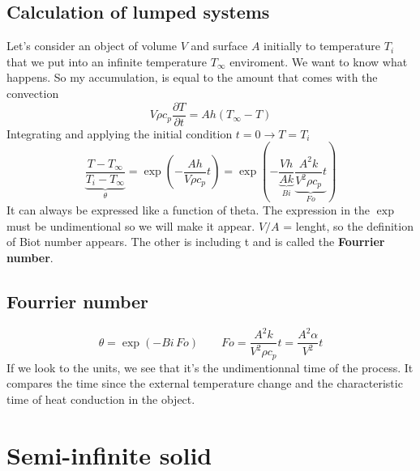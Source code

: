 	\subsection{Calculation of lumped systems}
		Let's consider an object of volume $V$ and surface $A$ initially to temperature $T_i$ that we put into an infinite temperature $T_\infty$ enviroment. We want to know what happens. So my accumulation, is equal to the amount that comes with the convection
		\begin{equation}
			V\rho c_p \frac{\partial T}{\partial t} = A h(T_\infty - T)
		\end{equation}
		Integrating and applying the initial condition $t = 0 \rightarrow T = T_i$
		\begin{equation}
			\underbrace{\frac{T-T_\infty}{T_i - T_\infty}}_{\theta} =
			 \exp \left( - \frac{Ah}{V\rho c_p}t \right) = 
			 \exp \left( - \underbrace{\frac{Vh}{Ak}}_{Bi} \underbrace{\frac{A^2k}{V^2\rho c_p}t}_{Fo} \right) 
		\end{equation}
It can always be expressed like a function of theta. 
The expression in the $\exp$ must be undimentional so we will make it appear. $V/A$ = lenght, so the definition of Biot number appears. The other is including t and is called the \textbf{Fourrier number}. 

	\subsection{Fourrier number}
		\begin{equation}
			\theta = \exp (-Bi \, Fo) \qquad Fo = \frac{A^2k}{V^2 \rho c_p}t = \frac{A^2\alpha }{V^2}t
		\end{equation}
		If we look to the units, we see that it's the undimentionnal time of the process. It compares the time since the external temperature change and the characteristic time of heat conduction in the object. 
		
\section{Semi-infinite solid}
